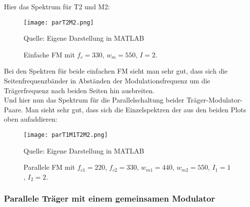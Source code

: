 \FloatBarrier
Hier das Spektrum für T2 und M2:
\FloatBarrier
\begin{figure} [ht]
\centering
  \texttt{[image: parT2M2.png]}
\caption{Einfache FM mit $f_c = 330$, $w_m = 550$, $I = 2$. }
Quelle: Eigene Darstellung in MATLAB
\end{figure}
\FloatBarrier
Bei den Spektren für beide einfachen FM sieht man sehr gut, dass sich die Seitenfrequenzbänder in Abständen der Modulationsfrequenz um die Trägerfrequenz nach beiden Seiten hin ausbreiten.\\
Und hier nun das Spektrum für die Parallelschaltung beider Träger-Modulator-Paare. Man sieht sehr gut, dass sich die Einzelspektren der aus den beiden Plots oben aufaddieren: 
\FloatBarrier
\begin{figure} [ht]
\centering
  \texttt{[image: parT1M1T2M2.png]}
\caption{Parallele FM mit $f_{c1} = 220$, $f_{c2} = 330$, $w_{m1} = 440$, $w_{m2} = 550$, $I_1 = 1$, $I_2 = 2$. }
Quelle: Eigene Darstellung in MATLAB
\end{figure}
\FloatBarrier

\subsubsection{Parallele Träger mit einem gemeinsamen Modulator}

